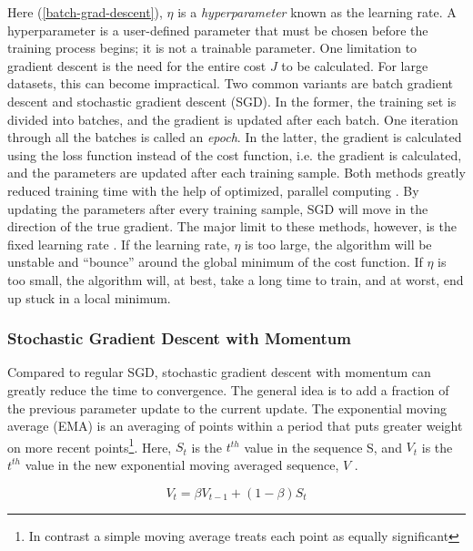 \noindent Here (\ref{batch-grad-descent}), $ \eta $ is a \textit{hyperparameter} known as the learning rate. A hyperparameter is a user-defined parameter that must be chosen before the training process begins; it is not a trainable parameter. One limitation to gradient descent is the need for the entire cost $ J $ to be calculated. For large datasets, this can become impractical. Two common variants are batch gradient descent and stochastic gradient descent (SGD). In the former, the training set is divided into batches, and the gradient is updated after each batch. One iteration through all the batches is called an \textit{epoch}. In the latter, the gradient is calculated using the loss function instead of the cost function, i.e. the gradient is calculated, and the parameters are updated after each training sample. Both methods greatly reduced training time with the help of optimized, parallel computing \cite{stoch-grad-desc-parallel}. By updating the parameters after every training sample, SGD will move in the direction of the true gradient. The major limit to these methods, however, is the fixed learning rate \cite{grad-desc-limits}. If the learning rate, $ \eta $ is too large, the algorithm will be unstable and ``bounce'' around the global minimum of the cost function. If $ \eta $ is too small, the algorithm will, at best, take a long time to train, and at worst, end up stuck in a local minimum. 

\subsubsection{Stochastic Gradient Descent with Momentum}
Compared to regular SGD, stochastic gradient descent with momentum \cite{grad-desc-with-mom-orig} can greatly reduce the time to convergence. The general idea is to add a fraction of the previous parameter update to the current update. The exponential moving average (EMA) is an averaging of points within a period that puts greater weight on more recent points\footnote{In contrast a simple moving average treats each point as equally significant}. Here, $ S_t $ is the $ t^{th} $  value in the sequence S, and $ V_t $ is the $ t^{th} $  value in the new exponential moving averaged sequence, $ V $ .

\begin{equation}
    \label{eq:SGD-w-momentum}
    V_t = \beta V_{t-1} + (1 - \beta)S_t
\end{equation}

